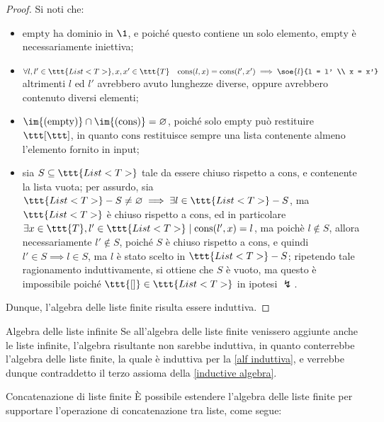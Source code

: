 \documentclass[a4paper, 12pt]{report}
\begin{document}
    \begin{proof}
        Si noti che:

        \begin{itemize}
            \item $\mathrm{empty}$ ha dominio in $\1$, e poiché questo contiene un solo elemento, $\mathrm{empty}$ è necessariamente iniettiva;
            \item $\forall l, l' \in \ttt{List<T>}, x, x' \in \ttt{T} \quad \mathrm{cons}(l, x) = \mathrm{cons}(l', x') \implies \soe{l}{l = l' \\ x = x'}$ altrimenti $l$ ed $l'$ avrebbero avuto lunghezze diverse, oppure avrebbero contenuto diversi elementi;
            \item $\im{(\mathrm{empty})} \cap \im{(\mathrm{cons})} = \varnothing$, poiché solo $\mathrm{empty}$ può restituire $\ttt [ \ttt ]$, in quanto $\mathrm{cons}$ restituisce sempre una lista contenente almeno l'elemento fornito in input;
            \item sia $S \subseteq \ttt{List<T>}$ tale da essere chiuso rispetto a $\mathrm{cons}$, e contenente la lista vuota; per assurdo, sia $\ttt{List<T>} - S \neq \varnothing \implies \exists l \in \ttt{List<T>} - S$, ma $\ttt{List<T>}$ è chiuso rispetto a $\mathrm{cons}$, ed in particolare $\exists x \in \ttt{T}, l' \in \ttt{List<T>} \mid \mathrm{cons}(l', x) = l$, ma poichè $l \notin S$, allora necessariamente $l' \notin S$, poiché $S$ è chiuso rispetto a $\mathrm{cons}$, e quindi $l' \in S \implies l \in S$, ma $l$ è stato scelto in $\ttt{List<T>} - S$; ripetendo tale ragionamento induttivamente, si ottiene che $S$ è vuoto, ma questo è impossibile poiché $\ttt{[]} \in \ttt{List<T>}$ in ipotesi $\lightning$.
        \end{itemize}

        Dunque, l'algebra delle liste finite risulta essere induttiva.
    \end{proof}

    \begin{framedobs}[label={infinite lists}]{Algebra delle liste infinite}
        Se all'algebra delle liste finite venissero aggiunte anche le liste infinite, l'algebra risultante non sarebbe induttiva, in quanto conterrebbe l'algebra delle liste finite, la quale è induttiva per la \cref{alf induttiva}, e verrebbe dunque contraddetto il terzo assioma della \cref{inductive algebra}.
    \end{framedobs}

    \begin{framedobs}{Concatenazione di liste finite}
        È possibile estendere l'algebra delle liste finite per supportare l'operazione di concatenazione tra liste, come segue: 
    \end{framedobs}
\end{document}
